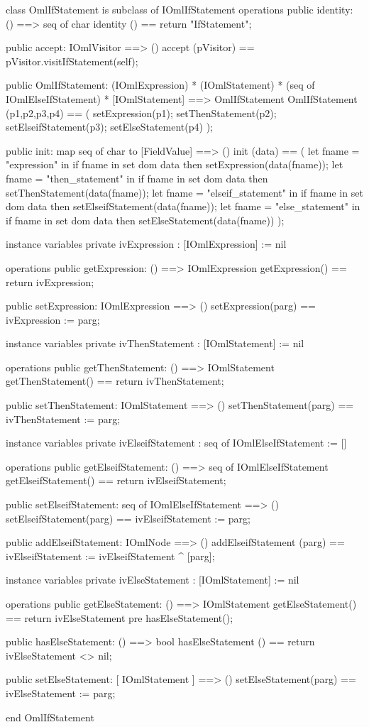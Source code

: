 \begin{vdm_al}
class OmlIfStatement is subclass of IOmlIfStatement
operations
  public identity: () ==> seq of char
  identity () == return "IfStatement";

  public accept: IOmlVisitor ==> ()
  accept (pVisitor) == pVisitor.visitIfStatement(self);

  public OmlIfStatement:
      (IOmlExpression) *
      (IOmlStatement) *
      (seq of IOmlElseIfStatement) *
      [IOmlStatement] ==> OmlIfStatement
  OmlIfStatement (p1,p2,p3,p4) == 
   ( setExpression(p1);
     setThenStatement(p2);
     setElseifStatement(p3);
     setElseStatement(p4) );

  public init: map seq of char to [FieldValue] ==> ()
  init (data) ==
    ( let fname = "expression" in
        if fname in set dom data
        then setExpression(data(fname));
      let fname = "then_statement" in
        if fname in set dom data
        then setThenStatement(data(fname));
      let fname = "elseif_statement" in
        if fname in set dom data
        then setElseifStatement(data(fname));
      let fname = "else_statement" in
        if fname in set dom data
        then setElseStatement(data(fname)) );

instance variables
  private ivExpression : [IOmlExpression] := nil

operations
  public getExpression: () ==> IOmlExpression
  getExpression() == return ivExpression;

  public setExpression: IOmlExpression ==> ()
  setExpression(parg) == ivExpression := parg;

instance variables
  private ivThenStatement : [IOmlStatement] := nil

operations
  public getThenStatement: () ==> IOmlStatement
  getThenStatement() == return ivThenStatement;

  public setThenStatement: IOmlStatement ==> ()
  setThenStatement(parg) == ivThenStatement := parg;

instance variables
  private ivElseifStatement : seq of IOmlElseIfStatement := []

operations
  public getElseifStatement: () ==> seq of IOmlElseIfStatement
  getElseifStatement() == return ivElseifStatement;

  public setElseifStatement: seq of IOmlElseIfStatement ==> ()
  setElseifStatement(parg) == ivElseifStatement := parg;

  public addElseifStatement: IOmlNode ==> ()
  addElseifStatement (parg) == ivElseifStatement := ivElseifStatement ^ [parg];

instance variables
  private ivElseStatement : [IOmlStatement] := nil

operations
  public getElseStatement: () ==> IOmlStatement
  getElseStatement() == return ivElseStatement
    pre hasElseStatement();

  public hasElseStatement: () ==> bool
  hasElseStatement () == return ivElseStatement <> nil;

  public setElseStatement: [ IOmlStatement ] ==> ()
  setElseStatement(parg) == ivElseStatement := parg;

end OmlIfStatement
\end{vdm_al}

